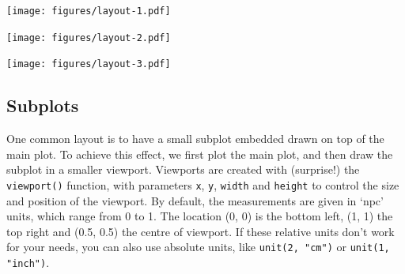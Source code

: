 \texttt{[image: figures/layout-1.pdf]}

\begin{Shaded}
\begin{Highlighting}[]
\StringTok{ } \StringTok{ }
\StringTok{  }\NormalTok{(} 
\end{Highlighting}
\end{Shaded}

\texttt{[image: figures/layout-2.pdf]}

\begin{Shaded}
\begin{Highlighting}[]
\StringTok{ } \NormalTok{))}
\end{Highlighting}
\end{Shaded}

\texttt{[image: figures/layout-3.pdf]}

\subsection{Subplots}

One common layout is to have a small subplot embedded drawn on top of
the main plot. To achieve this effect, we first plot the main plot, and
then draw the subplot in a smaller viewport. Viewports are created with
(surprise!) the \texttt{viewport()} function, with parameters
\texttt{x}, \texttt{y}, \texttt{width} and \texttt{height} to control
the size and position of the viewport. By default, the measurements are
given in `npc' units, which range from 0 to 1. The location (0, 0) is
the bottom left, (1, 1) the top right and (0.5, 0.5) the centre of
viewport. If these relative units don't work for your needs, you can
also use absolute units, like \texttt{unit(2, "cm")} or
\texttt{unit(1, "inch")}.  

